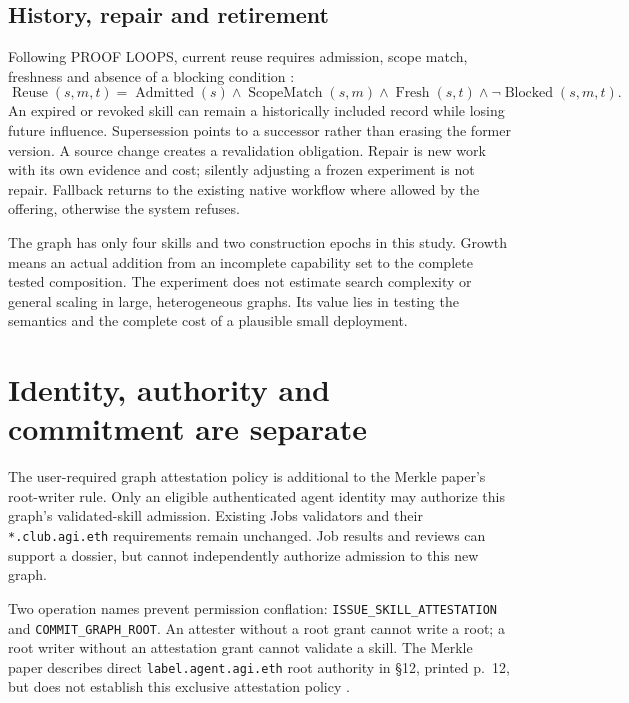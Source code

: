 \documentclass[11pt,a4paper]{article}
\newcommand{\code}[1]{\nolinkurl{#1}}
\begin{document}
\subsection{History, repair and retirement}
Following PROOF LOOPS, current reuse requires admission, scope match, freshness and absence of a blocking condition \citep[§14, p.~7]{proofloops}:
\begin{equation}
\operatorname{Reuse}(s,m,t)=\operatorname{Admitted}(s)\land
\operatorname{ScopeMatch}(s,m)\land\operatorname{Fresh}(s,t)\land
\neg\operatorname{Blocked}(s,m,t).
\end{equation}
An expired or revoked skill can remain a historically included record while losing future influence. Supersession points to a successor rather than erasing the former version. A source change creates a revalidation obligation. Repair is new work with its own evidence and cost; silently adjusting a frozen experiment is not repair. Fallback returns to the existing native workflow where allowed by the offering, otherwise the system refuses.

The graph has only four skills and two construction epochs in this study. Growth means an actual addition from an incomplete capability set to the complete tested composition. The experiment does not estimate search complexity or general scaling in large, heterogeneous graphs. Its value lies in testing the semantics and the complete cost of a plausible small deployment.

\section{Identity, authority and commitment are separate}
\label{sec:authority}
The user-required graph attestation policy is additional to the Merkle paper's root-writer rule. Only an eligible authenticated agent identity may authorize this graph's validated-skill admission. Existing Jobs validators and their \code{*.club.agi.eth} requirements remain unchanged. Job results and reviews can support a dossier, but cannot independently authorize admission to this new graph.

Two operation names prevent permission conflation: \code{ISSUE_SKILL_ATTESTATION} and \code{COMMIT_GRAPH_ROOT}. An attester without a root grant cannot write a root; a root writer without an attestation grant cannot validate a skill. The Merkle paper describes direct \code{label.agent.agi.eth} root authority in §12, printed p.~12, but does not establish this exclusive attestation policy \citep{merkle}.
\end{document}
